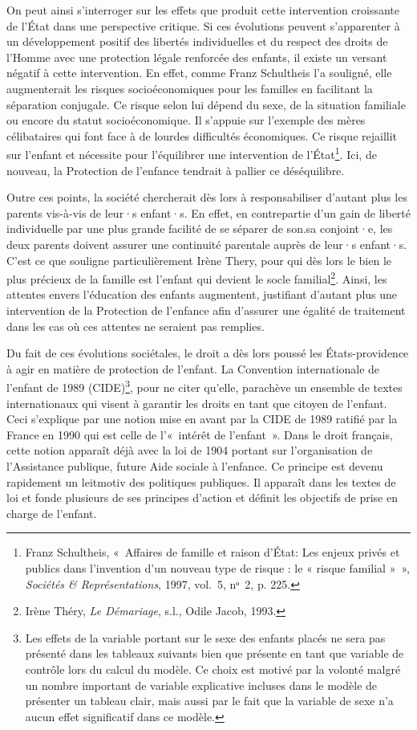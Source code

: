 \documentclass[
  12,
  a4paper,
]{report}
\begin{document}
On peut ainsi s'interroger sur les effets que produit cette intervention
croissante de l'État dans une perspective critique. Si ces évolutions
peuvent s'apparenter à un développement positif des libertés
individuelles et du respect des droits de l'Homme avec une protection
légale renforcée des enfants, il existe un versant négatif à cette
intervention. En effet, comme Franz Schultheis l'a souligné, elle
augmenterait les risques socioéconomiques pour les familles en
facilitant la séparation conjugale. Ce risque selon lui dépend du sexe,
de la situation familiale ou encore du statut socioéconomique. Il
s'appuie sur l'exemple des mères célibataires qui font face à de lourdes
difficultés économiques. Ce risque rejaillit sur l'enfant et nécessite
pour l'équilibrer une intervention de l'État\footnote{Franz Schultheis,
  {«~Affaires de famille et raison d'État: Les enjeux privés et publics
  dans l'invention d'un nouveau type de risque : le « risque familial
  »~»}, \emph{Sociétés \& Représentations}, 1997, vol.~5, nᵒ~2, p. 225.}.
Ici, de nouveau, la Protection de l'enfance tendrait à pallier ce
déséquilibre.

Outre ces points, la société chercherait dès lors à responsabiliser
d'autant plus les parents vis-à-vis de leur·s enfant·s. En effet, en
contrepartie d'un gain de liberté individuelle par une plus grande
facilité de se séparer de son.sa conjoint·e, les deux parents doivent
assurer une continuité parentale auprès de leur·s enfant·s. C'est ce que
souligne particulièrement Irène Thery, pour qui dès lors le bien le plus
précieux de la famille est l'enfant qui devient le socle
familial\footnote{Irène Théry, \emph{Le Démariage}, s.l., {Odile Jacob},
  1993.}. Ainsi, les attentes envers l'éducation des enfants augmentent,
justifiant d'autant plus une intervention de la Protection de l'enfance
afin d'assurer une égalité de traitement dans les cas où ces attentes ne
seraient pas remplies.

Du fait de ces évolutions sociétales, le droit a dès lors poussé les
États-providence à agir en matière de protection de l'enfant. La
Convention internationale de l'enfant de 1989 (CIDE)\footnote{Les effets
  de la variable portant sur le sexe des enfants placés ne sera pas
  présenté dans les tableaux suivants bien que présente en tant que
  variable de contrôle lors du calcul du modèle. Ce choix est motivé par
  la volonté malgré un nombre important de variable explicative incluses
  dans le modèle de présenter un tableau clair, mais aussi par le fait
  que la variable de sexe n'a aucun effet significatif dans ce modèle.},
pour ne citer qu'elle, parachève un ensemble de textes internationaux
qui visent à garantir les droits en tant que citoyen de l'enfant. Ceci
s'explique par une notion mise en avant par la CIDE de 1989 ratifié par
la France en 1990 qui est celle de l'«~intérêt de l'enfant~». Dans le
droit français, cette notion apparaît déjà avec la loi de 1904 portant
sur l'organisation de l'Assistance publique, future Aide sociale à
l'enfance. Ce principe est devenu rapidement un leitmotiv des politiques
publiques. Il apparaît dans les textes de loi et fonde plusieurs de ses
principes d'action et définit les objectifs de prise en charge de
l'enfant.
\end{document}
